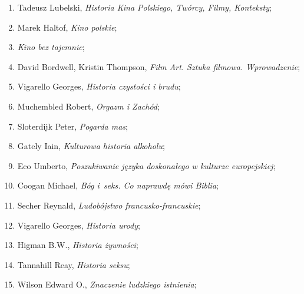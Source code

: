 \documentclass[a4paper,11pt]{article}
\begin{document}
\begin{enumerate}
\item Tadeusz Lubelski, \textit{Historia Kina Polskiego, Twórcy, Filmy,
    Konteksty};



\item Marek Haltof, \textit{Kino polskie};



\item \textit{Kino bez tajemnic};



\item David Bordwell, Kristin Thompson, \textit{Film Art. Sztuka
    filmowa. Wprowadzenie};



\item Vigarello Georges, \textit{Historia czystości i brudu};



\item Muchembled Robert, \textit{Orgazm i Zachód};



\item Sloterdijk Peter, \textit{Pogarda mas};



\item Gately Iain, \textit{Kulturowa historia alkoholu};



\item Eco Umberto, \textit{Poszukiwanie języka doskonałego w kulturze
    europejskiej};



\item Coogan Michael, \textit{Bóg i~seks. Co naprawdę mówi Biblia};



\item Secher Reynald, \textit{Ludobójstwo francusko-francuskie};



\item Vigarello Georges, \textit{Historia urody};



\item Higman B.W., \textit{Historia żywności};



\item Tannahill Reay, \textit{Historia seksu};



\item Wilson Edward O., \textit{Znaczenie ludzkiego istnienia};




\end{enumerate}
\end{document}
